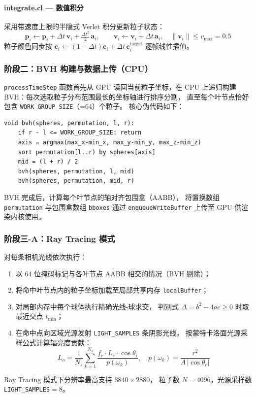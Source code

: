 \paragraph{integrate.cl — 数值积分}
采用带速度上限的半隐式 Verlet 积分更新粒子状态：
\begin{equation}
  \mathbf{p}_i \leftarrow \mathbf{p}_i + \Delta t\,\mathbf{v}_i
  + \tfrac{\Delta t^2}{2}\,\mathbf{a}_i, \qquad
  \mathbf{v}_i \leftarrow \mathbf{v}_i + \Delta t\,\mathbf{a}_i,
  \quad \|\mathbf{v}_i\| \leq v_{\max}=0.5
\end{equation}
粒子颜色同步按
$\mathbf{c}_i \leftarrow (1-\Delta t)\mathbf{c}_i + \Delta t\,\mathbf{c}^{\mathrm{target}}_i$
逐帧线性插值。

\subsubsection{阶段二：BVH 构建与数据上传（CPU）}

\texttt{processTimeStep} 函数首先从 GPU 读回当前粒子坐标，在 CPU 上递归构建
BVH：每次选取粒子分布范围最长的坐标轴进行排序分割，
直至每个叶节点恰好包含 \texttt{WORK\_GROUP\_SIZE}（=64）个粒子。
核心伪代码如下：

\begin{verbatim}
void bvh(spheres, permutation, l, r):
    if r - l <= WORK_GROUP_SIZE: return
    axis = argmax(max_x-min_x, max_y-min_y, max_z-min_z)
    sort permutation[l..r) by spheres[axis]
    mid = (l + r) / 2
    bvh(spheres, permutation, l, mid)
    bvh(spheres, permutation, mid, r)
\end{verbatim}

BVH 完成后，计算每个叶节点的轴对齐包围盒（AABB），
将置换数组 \texttt{permutation} 与包围盒数组 \texttt{bboxes}
通过 \texttt{enqueueWriteBuffer} 上传至 GPU 供渲染内核使用。

\subsubsection{阶段三-A：Ray Tracing 模式}

对每条相机光线依次执行：
\begin{enumerate}
  \item 以 64 位掩码标记与各叶节点 AABB 相交的情况（BVH 剔除）；
  \item 将命中叶节点内的粒子坐标加载至局部共享内存 \texttt{localBuffer}；
  \item 对局部内存中每个球体执行精确光线-球求交，
        判别式 $\Delta=b^2-4ac\geq0$ 时取最近交点 $t_{\min}$；
  \item 在命中点向区域光源发射 \texttt{LIGHT\_SAMPLES} 条阴影光线，
        按蒙特卡洛面光源采样公式计算辐亮度贡献：
        \begin{equation}
          L_o = \frac{1}{N_s}\sum_{k=1}^{N_s}
          \frac{f_r \cdot L_e \cdot \cos\theta_i}{p(\omega_k)},
          \quad p(\omega_k) = \frac{r^2}{A\,|\cos\theta_e|}
        \end{equation}
\end{enumerate}
Ray Tracing 模式下分辨率最高支持 $3840\times2880$，
粒子数 $N=4096$，光源采样数 \texttt{LIGHT\_SAMPLES}$=8$。

